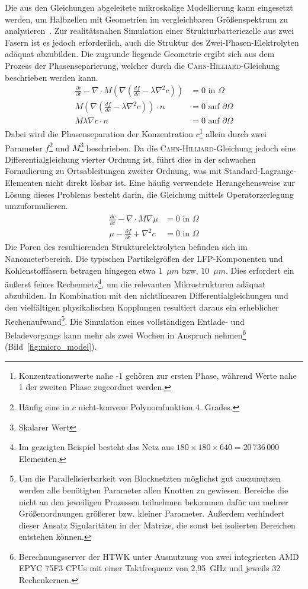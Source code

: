 Die aus den Gleichungen abgeleitete mikroskalige Modellierung kann eingesetzt werden, um Halbzellen mit Geometrien im vergleichbaren Größenspektrum zu analysieren~\cite{Plett2015}. Zur realitätsnahen Simulation einer Strukturbatteriezelle aus zwei Fasern ist es jedoch erforderlich, auch die Struktur des Zwei-Phasen-Elektrolyten adäquat abzubilden\cite{Tu2020}. Die zugrunde liegende Geometrie ergibt sich aus dem Prozess der Phasenseparierung, welcher durch die \textsc{Cahn-Hilliard}-Gleichung beschrieben werden kann\cite{Carolan2015,Grant1993}.
\begin{align}
    \frac{\partial c}{\partial t} - \nabla \cdot M \left( \nabla \left( \frac{df}{dc} - \lambda \nabla^2 c\right) \right) &= 0 \text{ in }\Omega\\
    M\left( \nabla \left( \frac{df}{dc} - \lambda \nabla^2 c \right)\right) \cdot n &= 0 \text{ auf }\partial\Omega\\
    M \lambda \nabla c \cdot n &= 0 \text{ auf }\partial\Omega
\end{align}
Dabei wird die Phasenseparation der Konzentration $c$\footnote{Konzentrationswerte nahe -1 gehören zur ersten Phase, während Werte nahe 1 der zweiten Phase zugeordnet werden.} allein durch zwei Parameter $f$\footnote{Häufig eine in $c$ nicht-konvexe Polynomfunktion 4. Grades.} und $M$\footnote{Skalarer Wert} beschrieben. Da die \textsc{Cahn-Hilliard}-Gleichung jedoch eine Differentialgleichung vierter Ordnung ist, führt dies in der schwachen Formulierung zu Ortsableitungen zweiter Ordnung, was mit Standard-Lagrange-Elementen nicht direkt lösbar ist. Eine häufig verwendete Herangehensweise zur Lösung dieses Problems besteht darin, die Gleichung mittels Operatorzerlegung umzuformulieren.
\begin{align}
    \frac{\partial c}{\partial t} - \nabla \cdot M \nabla \mu &= 0 \text{ in }\Omega\\
    \mu - \frac{\partial f}{\partial c} + \nabla^2 c &= 0 \text{ in }\Omega
\end{align}
Die Poren des resultierenden Strukturelektrolyten befinden sich im Nanometerbereich. Die typischen Partikelgrößen der LFP-Komponenten und Kohlenstofffasern betragen hingegen etwa 1~$\mu m$ bzw. 10~$\mu m$. Dies erfordert ein äußerst feines Rechennetz\footnote{Im gezeigten Beispiel besteht das Netz aus $180 \times 180 \times 640 = 20\,736\,000$ Elementen.}, um die relevanten Mikrostrukturen adäquat abzubilden.
In Kombination mit den nichtlinearen Differentialgleichungen und den vielfältigen physikalischen Kopplungen resultiert daraus ein erheblicher Rechenaufwand\footnote{Um die Parallelisierbarkeit von Blocknetzten möglichst gut auszunutzen werden alle benötigten Parameter allen Knotten zu gewiesen. Bereiche die nicht an den jeweiligen Prozessen teilnehmen bekommen dafür um mehrer Größenordnungen größerer bzw. kleiner Parameter. Außerdem verhindert dieser Ansatz Sigularitäten in der Matrize, die sonst bei isolierten Bereichen entstehen können.}. Die Simulation eines vollständigen Entlade- und Beladevorgangs kann mehr als zwei Wochen in Anspruch nehmen\footnote{Berechnungsserver der HTWK unter Ausnutzung von zwei integrierten AMD EPYC 75F3 CPUs mit einer Taktfrequenz von 2{,}95~GHz und jeweils 32 Rechenkernen.} (Bild~\ref{fig:micro_model}).


